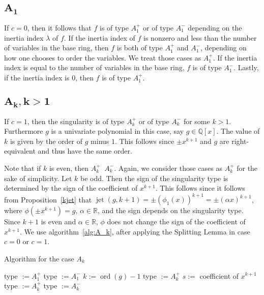 \documentclass[noend]{amsproc}
\theoremstyle{definition}
\DeclareMathOperator{\ord}{ord}
\DeclareMathOperator{\requiv}{\overset{r}{\sim}}
\DeclareMathOperator{\jet}{jet}
\begin{document}
\subsection{$\boldsymbol{A_1}$}
If $c = 0$, then it follows that $f$ is of type $A_1^+$ or of type $A_1^-$
depending on the inertia index $\lambda$ of $f$. If the inertia index of $f$ is
nonzero and less than the number of variables in the base ring, then $f$ is
both of type $A_1^+$ and $A_1^-$, depending on how one chooses to order the
variables. We treat those cases as $A_1^+$. If the inertia index is equal to
the number of variables in the base ring, $f$ is of type $A_1^-$. Lastly, if
the inertia index is $0$, then $f$ is of type $A_1^+$.

\subsection{$\boldsymbol{A_k, k > 1}$}
If $c=1$, then the singularity is of type $A_k^+$ or of type $A_k^-$ for some
$k>1$. Furthermore $g$ is a univariate polynomial in this case, say
$g\in\mathbb Q[x]$. The value of $k$ is given by the order of $g$ minus $1$.
This follows since $\pm x^{k+1}$ and $g$ are right-equivalent and thus have the
same order.

Note that if $k$ is even, then $A_k^+\requiv A_k^-$. Again, we consider those
cases as $A_k^+$ for the sake of simplicity. Let $k$ be odd. Then the sign of
the singularity type is determined by the sign of the coefficient of $x^{k+1}$.
This follows since it follows from Proposition~\ref{kjet} that
$\jet(g, k+1)=\pm(\phi_1(x))^{k+1}=\pm(\alpha x)^{k+1}$, where
$\phi(\pm x^{k+1})=g$, $\alpha\in\mathbb R$, and the sign depends on the
singularity type. Since $k+1$ is even and $\alpha\in\mathbb R$, $\phi$ does not
change the sign of the coefficient of $x^{k+1}$. We use
algorithm~\ref{alg:A_k}, after applying the Splitting Lemma in case $c=0$ or
$c=1$.

\begin{algorithm}[ht]
\caption{\label{alg:A_k} Algorithm for the case $A_k$}
\begin{algorithmic}[1]



\STATE type $:=A_1^+$
\ELSE
\STATE type $:=A_1^-$
\ENDIF
\ENDIF
{}
\STATE $k:= \ord(g)-1$
\STATE type $:=A_k^+$
\ELSE
\STATE $s:=$ coefficient of $x^{k+1}$
\STATE type $:=A_k^+$
\ELSE
\STATE type $:=A_k^-$
\ENDIF
\ENDIF
\ENDIF
{}

\end{algorithmic}
\end{algorithm}
\end{document}
